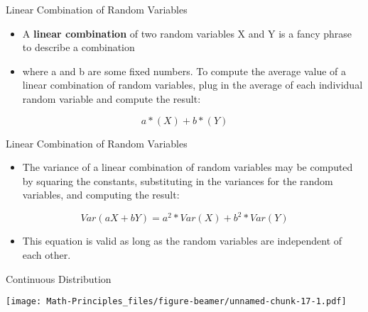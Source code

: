 \documentclass[
  ignorenonframetext,
]{beamer}
\newenvironment{Shaded}{\begin{snugshade}}{\end{snugshade}}
\newcommand{\KeywordTok}[1]{\textcolor[rgb]{0.13,0.29,0.53}{\textbf{#1}}}
\newcommand{\NormalTok}[1]{#1}
\newcommand{\OperatorTok}[1]{\textcolor[rgb]{0.81,0.36,0.00}{\textbf{#1}}}
\newcommand{\StringTok}[1]{\textcolor[rgb]{0.31,0.60,0.02}{#1}}
\providecommand{\tightlist}{%
  \setlength{\itemsep}{0pt}\setlength{\parskip}{0pt}}
\begin{document}
\begin{frame}{Linear Combination of Random Variables}
\protect\hypertarget{linear-combination-of-random-variables}{}

\begin{itemize}
\item
  A \textbf{linear combination} of two random variables X and Y is a
  fancy phrase to describe a combination
\item
  where a and b are some fixed numbers. To compute the average value of
  a linear combination of random variables, plug in the average of each
  individual random variable and compute the result:
\end{itemize}

\[a*(X)+b*(Y)\]

\end{frame}

\begin{frame}{Linear Combination of Random Variables}
\protect\hypertarget{linear-combination-of-random-variables-1}{}

\begin{itemize}
\tightlist
\item
  The variance of a linear combination of random variables may be
  computed by squaring the constants, substituting in the variances for
  the random variables, and computing the result:
\end{itemize}

\[Var(aX+bY)= a^{2}*Var(X) + b^{2}*Var(Y)\]

\begin{itemize}
\tightlist
\item
  This equation is valid as long as the random variables are independent
  of each other.
\end{itemize}

\end{frame}

\begin{frame}[fragile]{Continuous Distribution}
\protect\hypertarget{continuous-distribution}{}

\begin{Shaded}
\end{Shaded}

\texttt{[image: Math-Principles\_files/figure-beamer/unnamed-chunk-17-1.pdf]}

\end{frame}
\end{document}
